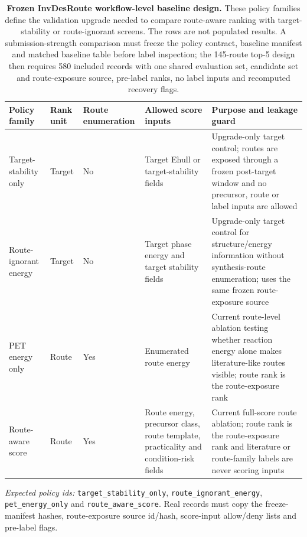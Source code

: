 \documentclass[11pt, letterpaper]{article}
\renewcommand{\arraystretch}{1.08}
\begin{document}
\begin{table}[p]
\centering
\tiny
\caption{\textbf{Frozen InvDesRoute workflow-level baseline design.} These policy families define the validation upgrade needed to compare route-aware ranking with target-stability or route-ignorant screens. The rows are not populated results. A submission-strength comparison must freeze the policy contract, baseline manifest and matched baseline table before label inspection; the 145-route top-5 design then requires 580 included records with one shared evaluation set, candidate set and route-exposure source, pre-label ranks, no label inputs and recomputed recovery flags.}
\begingroup
\setlength{\tabcolsep}{3pt}
\renewcommand{\arraystretch}{1.08}
\begin{tabular}{L{0.22\textwidth}L{0.11\textwidth}L{0.15\textwidth}L{0.18\textwidth}L{0.24\textwidth}}
\toprule
\textbf{Policy family} & \textbf{Rank unit} & \textbf{Route enumeration} & \textbf{Allowed score inputs} & \textbf{Purpose and leakage guard} \\
\midrule
Target-stability only & Target & No & Target Ehull or target-stability fields & Upgrade-only target control; routes are exposed through a frozen post-target window and no precursor, route or label inputs are allowed \\
Route-ignorant energy & Target & No & Target phase energy and target stability fields & Upgrade-only target control for structure/energy information without synthesis-route enumeration; uses the same frozen route-exposure source \\
PET energy only & Route & Yes & Enumerated route energy & Current route-level ablation testing whether reaction energy alone makes literature-like routes visible; route rank is the route-exposure rank \\
Route-aware score & Route & Yes & Route energy, precursor class, route template, practicality and condition-risk fields & Current full-score route ablation; route rank is the route-exposure rank and literature or route-family labels are never scoring inputs \\
\bottomrule
\end{tabular}
\endgroup
\vspace{2pt}
\footnotesize\emph{Expected policy ids:} \texttt{target\_stability\_only}, \texttt{route\_ignorant\_energy}, \texttt{pet\_energy\_only} and \texttt{route\_aware\_score}. Real records must copy the freeze-manifest hashes, route-exposure source id/hash, score-input allow/deny lists and pre-label flags.
\label{supp-tab:workflow_baseline_design}
\end{table}
\end{document}
